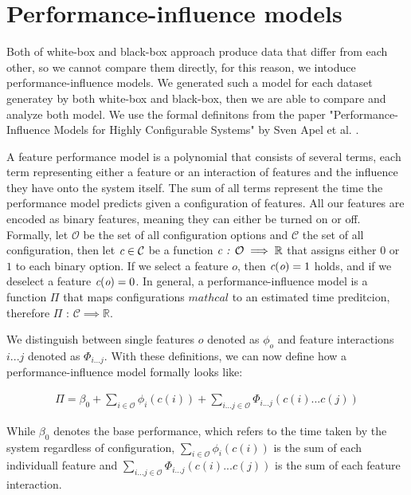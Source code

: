 \section{Performance-influence models}\label{ch:performance-influence-models}

Both of white-box and black-box approach produce data that differ from each other, so we cannot compare them directly, for 
this reason, we intoduce performance-influence models. We generated such a model for each dataset generatey by both white-box and black-box, then
we are able to compare and analyze both model. We use the formal definitons from the paper "Performance-Influence Models for
Highly Configurable Systems" by Sven Apel et al. \cite{Performance-influence-models-for-highly-configurable-systems}.

A feature performance model is a polynomial that consists of several terms, each term representing either a feature or an interaction
of features and the influence they have onto the system itself. The sum of all terms represent the time the performance model predicts
given a configuration of features. All our features are encoded as binary features, meaning they can either be turned on or off. Formally, 
let $\mathcal{O}$ be the set of all configuration options and $\mathcal{C}$ the set of all configuration, then  let $\emph{c} \in \mathcal{C}$ be
a function $\emph{c} \textit{ : } \mathcal{O} \implies \mathbb{R}$ that assigns either $0$ or $1$ to each binary option. If we select a feature
$o$, then $\emph{c}(\emph{o}) = 1$ holds, and if we deselect a feature $\emph{c}(\emph{o}) = 0$. In general, a performance-influence
model is a function $\Pi$ that maps configurations $mathcal$ to an estimated time preditcion, therefore $\Pi \textit{ : } \mathcal{C} \implies \mathbb{R}$.

We distinguish between single features $o$ denoted as $\phi_o$ and feature interactions $i ... j$ denoted as $\Phi_{i...j}$. With these
definitions, we can now define how a performance-influence model formally looks like:

\begin{gather}
    \Pi = \beta_0 + \sum_{i \in \mathcal{O}} \phi_i(c(i)) + \sum_{i...j \in \mathcal{O}} \Phi_{i...j}(c(i)...c(j))
\end{gather}

While $\beta_0$ denotes the base performance, which refers to the time taken by the system regardless of configuration, $\sum_{i \in \mathcal{O}} \phi_i(c(i))$
is the sum of each individuall feature and $\sum_{i...j \in \mathcal{O}} \Phi_{i...j}(c(i)...c(j))$ is the sum of each feature interaction.


